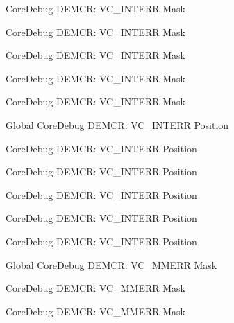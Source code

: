 \begin{DoxyRefList}
\label{deprecated__deprecated000344}%
%
Core\+Debug DEMCR\+: VC\+\_\+\+INTERR Mask 

\label{deprecated__deprecated000420}%
%
Core\+Debug DEMCR\+: VC\+\_\+\+INTERR Mask 

\label{deprecated__deprecated000058}%
%
Core\+Debug DEMCR\+: VC\+\_\+\+INTERR Mask 

\label{deprecated__deprecated000611}%
%
Core\+Debug DEMCR\+: VC\+\_\+\+INTERR Mask 

\label{deprecated__deprecated000509}%
%
Core\+Debug DEMCR\+: VC\+\_\+\+INTERR Mask  
\item[Global \doxylink{group___c_m_s_i_s___core_debug_ga22079a6e436f23b90308be97e19cf07e}{Core\+Debug\+\_\+\+DEMCR\+\_\+\+VC\+\_\+\+INTERR\+\_\+\+Pos} ]\label{deprecated__deprecated000201}%
%
Core\+Debug DEMCR\+: VC\+\_\+\+INTERR Position 

\label{deprecated__deprecated000057}%
%
Core\+Debug DEMCR\+: VC\+\_\+\+INTERR Position 

\label{deprecated__deprecated000610}%
%
Core\+Debug DEMCR\+: VC\+\_\+\+INTERR Position 

\label{deprecated__deprecated000343}%
%
Core\+Debug DEMCR\+: VC\+\_\+\+INTERR Position 

\label{deprecated__deprecated000508}%
%
Core\+Debug DEMCR\+: VC\+\_\+\+INTERR Position 

\label{deprecated__deprecated000419}%
%
Core\+Debug DEMCR\+: VC\+\_\+\+INTERR Position  
\item[Global \doxylink{group___c_m_s_i_s___core_debug_gad420a9b60620584faaca6289e83d3a87}{Core\+Debug\+\_\+\+DEMCR\+\_\+\+VC\+\_\+\+MMERR\+\_\+\+Msk} ]\label{deprecated__deprecated000621}%
%
Core\+Debug DEMCR\+: VC\+\_\+\+MMERR Mask 

\label{deprecated__deprecated000354}%
%
Core\+Debug DEMCR\+: VC\+\_\+\+MMERR Mask 

\label{deprecated__deprecated000068}%
%
Core\+Debug DEMCR\+: VC\+\_\+\+MMERR Mask 


\end{DoxyRefList}
